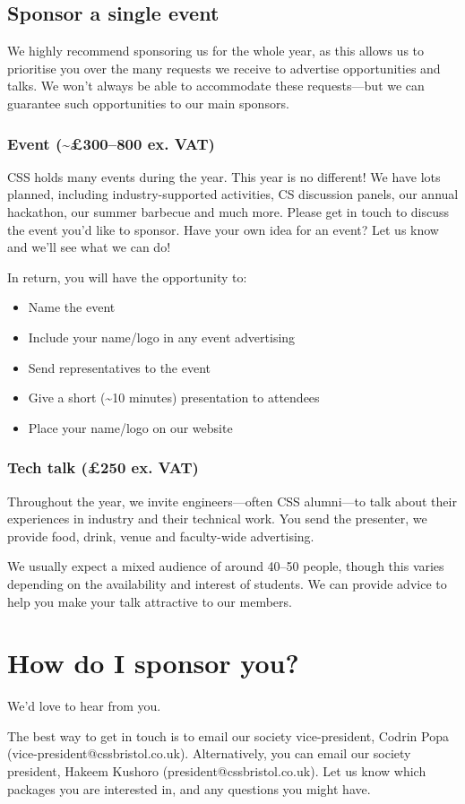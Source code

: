 \documentclass[]{article}
\begin{document}
\subsection*{Sponsor a single event}

We highly recommend sponsoring us for the whole year, as this allows us to prioritise you over the many requests we receive to advertise opportunities and talks. We won't always be able to accommodate these requests---but we can guarantee such opportunities to our main sponsors.

\subsubsection*{Event (\textasciitilde\pounds 300--800 ex. VAT)}

CSS holds many events during the year. This year is no different! We have lots planned, including industry-supported activities, CS discussion panels, our annual hackathon, our summer barbecue and much more. Please get in touch to discuss the event you'd like to sponsor. Have your own idea for an event? Let us know and we'll see what we can do!

In return, you will have the opportunity to:

\begin{itemize}
	\item Name the event
	\item Include your name/logo in any event advertising
	\item Send representatives to the event
	\item Give a short (\textasciitilde 10 minutes) presentation to attendees
	\item Place your name/logo on our website
\end{itemize}

\subsubsection*{Tech talk (\pounds 250 ex. VAT)}

Throughout the year, we invite engineers---often CSS alumni---to talk about their experiences in industry and their technical work. You send the presenter, we provide food, drink, venue and faculty-wide advertising.

We usually expect a mixed audience of around 40--50 people, though this varies depending on the availability and interest of students. We can provide advice to help you make your talk attractive to our members.

\section*{How do I sponsor you?}

We'd love to hear from you.

The best way to get in touch is to email our society vice-president, Codrin Popa (vice-president@cssbristol.co.uk). Alternatively, you can email our society president, Hakeem Kushoro (president@cssbristol.co.uk). Let us know which packages you are interested in, and any questions you might have.
\end{document}
